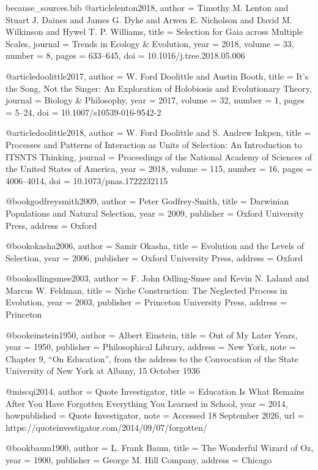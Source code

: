 \begin{filecontents*}{because_sources.bib}
@article{lenton2018,
  author  = {Timothy M. Lenton and Stuart J. Daines and James G. Dyke and Arwen E. Nicholson and David M. Wilkinson and Hywel T. P. Williams},
  title   = {Selection for Gaia across Multiple Scales},
  journal = {Trends in Ecology \& Evolution},
  year    = {2018},
  volume  = {33},
  number  = {8},
  pages   = {633--645},
  doi     = {10.1016/j.tree.2018.05.006}
}

@article{doolittle2017,
  author  = {W. Ford Doolittle and Austin Booth},
  title   = {It's the Song, Not the Singer: An Exploration of Holobiosis and Evolutionary Theory},
  journal = {Biology \& Philosophy},
  year    = {2017},
  volume  = {32},
  number  = {1},
  pages   = {5--24},
  doi     = {10.1007/s10539-016-9542-2}
}

@article{doolittle2018,
  author  = {W. Ford Doolittle and S. Andrew Inkpen},
  title   = {Processes and Patterns of Interaction as Units of Selection: An Introduction to {ITSNTS} Thinking},
  journal = {Proceedings of the National Academy of Sciences of the United States of America},
  year    = {2018},
  volume  = {115},
  number  = {16},
  pages   = {4006--4014},
  doi     = {10.1073/pnas.1722232115}
}

@book{godfreysmith2009,
  author    = {Peter Godfrey-Smith},
  title     = {Darwinian Populations and Natural Selection},
  year      = {2009},
  publisher = {Oxford University Press},
  address   = {Oxford}
}

@book{okasha2006,
  author    = {Samir Okasha},
  title     = {Evolution and the Levels of Selection},
  year      = {2006},
  publisher = {Oxford University Press},
  address   = {Oxford}
}

@book{odlingsmee2003,
  author    = {F. John Odling-Smee and Kevin N. Laland and Marcus W. Feldman},
  title     = {Niche Construction: The Neglected Process in Evolution},
  year      = {2003},
  publisher = {Princeton University Press},
  address   = {Princeton}
}

@book{einstein1950,
  author    = {Albert Einstein},
  title     = {Out of My Later Years},
  year      = {1950},
  publisher = {Philosophical Library},
  address   = {New York},
  note      = {Chapter 9, ``On Education'', from the address to the Convocation of the State University of New York at Albany, 15 October 1936}
}

@misc{qi2014,
  author       = {{Quote Investigator}},
  title        = {Education Is What Remains After You Have Forgotten Everything You Learned in School},
  year         = {2014},
  howpublished = {Quote Investigator},
  note         = {Accessed 18 September 2026},
  url          = {https://quoteinvestigator.com/2014/09/07/forgotten/}
}

@book{baum1900,
  author    = {L. Frank Baum},
  title     = {The Wonderful Wizard of Oz},
  year      = {1900},
  publisher = {George M. Hill Company},
  address   = {Chicago}
}
\end{filecontents*}

